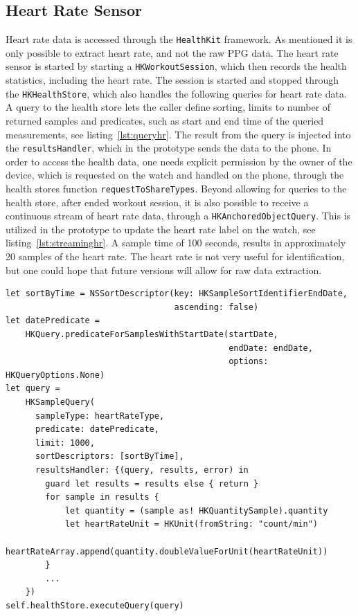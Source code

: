 \subsection{Heart Rate Sensor}
Heart rate data is accessed through the \texttt{HealthKit} framework. As
mentioned it is only possible to extract heart rate, and not the raw PPG data.
The heart rate sensor is started by starting a \texttt{HKWorkoutSession}, which
then records the health statistics, including the heart rate. The session is
started and stopped through the \texttt{HKHealthStore}, which also handles the
following queries for heart rate data. A query to the health store lets the
caller define sorting, limits to number of returned samples and predicates, such
as start and end time of the queried measurements, see listing~\ref{lst:queryhr}. 
The result from the query is injected into the \texttt{resultsHandler}, which in 
the prototype sends the data
to the phone.
In order to access the health data, one needs explicit permission by the owner 
of the device, which is requested on the watch and handled on the phone, through
the health stores function \texttt{requestToShareTypes}.
Beyond allowing for queries to the health store, after ended workout session, it
is also possible to receive a continuous stream of heart rate data, through a
\texttt{HKAnchoredObjectQuery}. This is utilized in the prototype to update the 
heart rate label on the watch, see listing~\ref{lst:streaminghr}.
A sample time of 100 seconds, results in approximately 20 samples of the
heart rate. The heart rate is not very useful for identification, but one could
hope that future versions will allow for raw data extraction.


\begin{lstlisting}[label={lst:queryhr},caption={Setting up a query for heart
rate samples. Including a time sorting descriptor, a date predicate and a
handler for the returned results.},basicstyle=\small]
let sortByTime = NSSortDescriptor(key: HKSampleSortIdentifierEndDate, 
                                  ascending: false)
let datePredicate = 
    HKQuery.predicateForSamplesWithStartDate(startDate, 
                                             endDate: endDate, 
                                             options: HKQueryOptions.None)
let query = 
    HKSampleQuery(
      sampleType: heartRateType,
      predicate: datePredicate,
      limit: 1000,
      sortDescriptors: [sortByTime],
      resultsHandler: {(query, results, error) in
        guard let results = results else { return }
        for sample in results {
            let quantity = (sample as! HKQuantitySample).quantity
            let heartRateUnit = HKUnit(fromString: "count/min")
            heartRateArray.append(quantity.doubleValueForUnit(heartRateUnit))
        }
        ...
    })
self.healthStore.executeQuery(query)
\end{lstlisting}

